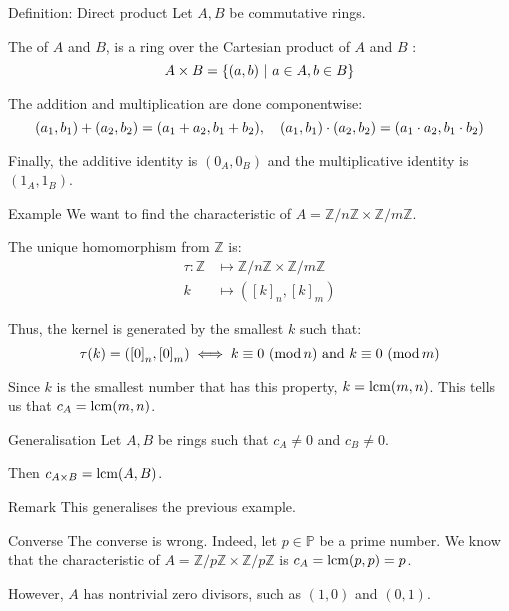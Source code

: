\documentclass[a4paper]{article}
\begin{document}
\begin{parag}{Definition: Direct product}
    Let $A, B$ be commutative rings.

    The  of $A$ and $B$, is a ring over the Cartesian product of $A$ and $B$ :
    \[A \times B = \left\{\left(a, b\right) \suchthat a \in A, b \in B\right\}\]
    
    The addition and multiplication are done componentwise: 
    \[\left(a_1, b_1\right) + \left(a_2, b_2\right)= \left(a_1 + a_2, b_1 + b_2\right), \mathspace \left(a_1, b_1\right)\cdot \left(a_2, b_2\right) =\left(a_1\cdot a_2, b_1\cdot b_2\right)\]
    
    Finally, the additive identity is $\left(0_A, 0_B\right)$ and the multiplicative identity is $\left(1_A, 1_B\right)$.
\end{parag}

\begin{parag}{Example}
    We want to find the characteristic of $A = \mathbb{Z}/n\mathbb{Z} \times \mathbb{Z}/m\mathbb{Z}$.

    The unique homomorphism from $\mathbb{Z}$ is:
    \[\begin{split}
    \tau: \mathbb{Z} &\longmapsto \mathbb{Z}/n\mathbb{Z} \times \mathbb{Z}/m\mathbb{Z} \\
    k &\longmapsto \left(\left[k\right]_n, \left[k\right]_m\right)
    \end{split}\]
    
    Thus, the kernel is generated by the smallest $k$ such that: 
    \[\tau\left(k\right) = \left(\left[0\right]_n, \left[0\right]_m\right) \iff \congruent{k}{0}{n} \text{ and } \congruent{k}{0}{m}\]

    Since $k$ is the smallest number that has this property, $k = \lcm\left(m, n\right)$. This tells us that $c_A = \lcm\left(m, n\right)$.
\end{parag}

\begin{parag}{Generalisation}
    Let $A, B$ be rings such that $c_A \neq 0$ and $c_B \neq 0$.

    Then $c_{A \times B} = \lcm\left(A, B\right)$.

    \begin{subparag}{Remark}
        This generalises the previous example.
    \end{subparag}

    \begin{subparag}{Converse}
        The converse is wrong. Indeed, let $p \in \mathbb{P}$ be a prime number. We know that the characteristic of $A = \mathbb{Z}/p\mathbb{Z} \times \mathbb{Z}/p\mathbb{Z}$ is $c_A = \lcm\left(p, p\right) = p$.

        However, $A$ has nontrivial zero divisors, such as $\left(1, 0\right)$ and $\left(0, 1\right)$.
    \end{subparag}
\end{parag}
\end{document}
